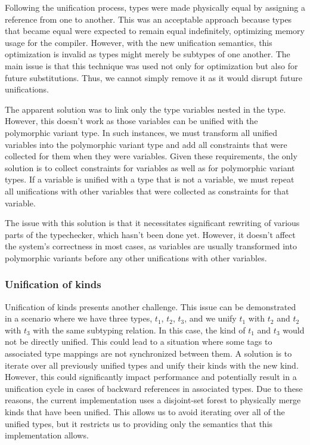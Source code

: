\documentclass[a4paper,11pt,oneside]{article}
\theoremstyle{definition}
\begin{document}
Following the unification process, types were made physically equal by assigning a reference from one to another. This was an acceptable approach because types that became equal were expected to remain equal indefinitely, optimizing memory usage for the compiler. However, with the new unification semantics, this optimization is invalid as types might merely be subtypes of one another. The main issue is that this technique was used not only for optimization but also for future substitutions. Thus, we cannot simply remove it as it would disrupt future unifications.

The apparent solution was to link only the type variables nested in the type. However, this doesn't work as those variables can be unified with the polymorphic variant type. In such instances, we must transform all unified variables into the polymorphic variant type and add all constraints that were collected for them when they were variables. Given these requirements, the only solution is to collect constraints for variables as well as for polymorphic variant types. If a variable is unified with a type that is not a variable, we must repeat all unifications with other variables that were collected as constraints for that variable.

The issue with this solution is that it necessitates significant rewriting of various parts of the typechecker, which hasn't been done yet. However, it doesn't affect the system's correctness in most cases, as variables are usually transformed into polymorphic variants before any other unifications with other variables.

\subsubsection{Unification of kinds}

Unification of kinds presents another challenge. This issue can be demonstrated in a scenario where we have three types, $t_1$, $t_2$, $t_3$, and we unify $t_1$ with $t_2$ and $t_2$ with $t_3$ with the same subtyping relation. In this case, the kind of $t_1$ and $t_3$ would not be directly unified. This could lead to a situation where some tags to associated type mappings are not synchronized between them. A solution is to iterate over all previously unified types and unify their kinds with the new kind. However, this could significantly impact performance and potentially result in a unification cycle in cases of backward references in associated types. Due to these reasons, the current implementation uses a disjoint-set forest \cite{DSF} to physically merge kinds that have been unified. This allows us to avoid iterating over all of the unified types, but it restricts us to providing only the semantics that this implementation allows.
\end{document}
